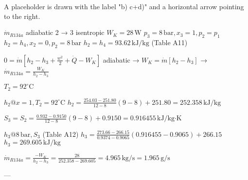 A placeholder is drawn with the label "b) c+d)" and a horizontal arrow pointing to the right.

\( \dot{m}_{R134a} \) adiabatic  
2 → 3 isentropic \( W_K = 28 \, \text{W} \)  
\( p_3 = 8 \, \text{bar}, x_3 = 1, p_2 = p_1 \)  
\( h_2 = h_4, x_2 = 0, p_2 = 8 \, \text{bar} \)  
\( h_2 = h_4 = 93.62 \, \text{kJ/kg} \) (Table A11)  

\( 0 = \dot{m} [h_2 - h_3 + \frac{w^2}{2} + \dot{Q} - W_K] \)  
adiabatic → \( W_K = \dot{m} [h_2 - h_3] \) → \( \dot{m}_{R134a} = \frac{W_K}{h_2 - h_3} \)  

\( T_2 = 92^\circ \text{C} \)  

\( h_2 @ x = 1, T_2 = 92^\circ \text{C} \)  
\( h_2 = \frac{254.03 - 251.80}{12 - 8} (9 - 8) + 251.80 = 252.358 \, \text{kJ/kg} \)  

\( S_3 = S_2 = \frac{0.932 - 0.9150}{12 - 8} (9 - 8) + 0.9150 = 0.916455 \, \text{kJ/kg·K} \)  

\( h_3 @ 8 \, \text{bar}, S_3 \) (Table A12)  
\( h_3 = \frac{273.66 - 266.15}{0.9374 - 0.9065} (0.916455 - 0.9065) + 266.15 \)  
\( h_3 = 269.605 \, \text{kJ/kg} \)  

\( \dot{m}_{R134a} = \frac{-W_K}{h_2 - h_3} = \frac{28}{252.358 - 269.605} = 4.965 \, \text{kg/s} = 1.965 \, \text{g/s} \)  

---
